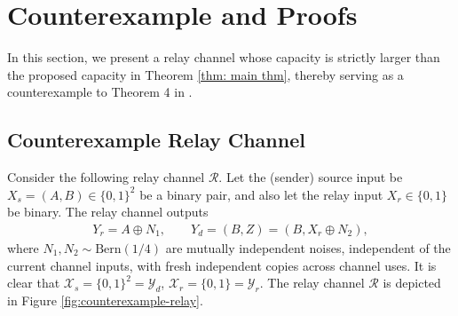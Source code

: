\documentclass[12pt]{article}
\theoremstyle{definition}
\begin{document}
\section{Counterexample and Proofs} \label{sec: counterexample and proofs}
In this section, we present a relay channel whose capacity is strictly larger than the proposed capacity in Theorem \ref{thm: main thm}, thereby serving as a counterexample to Theorem 4 in \cite{pon26}.%


\subsection{Counterexample Relay Channel} \label{sec: counterexample channel}
Consider the following relay channel $\mathcal R$. Let the (sender) source input be $X_s = (A,B) \in \{0,1\}^2$ be a binary pair, and also let the relay input $X_r \in \{0,1\}$ be binary. The relay channel outputs
\begin{align*}
    Y_r = A \oplus N_1, \qquad Y_d = (B, Z) = (B, X_r \oplus N_2),
\end{align*}
where $N_1, N_2 \sim \mathrm{Bern}(1/4)$ are mutually independent noises, independent of the current channel inputs, with fresh independent copies across channel uses. It is clear that $\mathcal X_s = \{0,1\}^2 = \mathcal Y_d$, $\mathcal X_r = \{0,1\} = \mathcal Y_r$. The relay channel $\mathcal R$ is depicted in Figure \ref{fig:counterexample-relay}.
\end{document}
